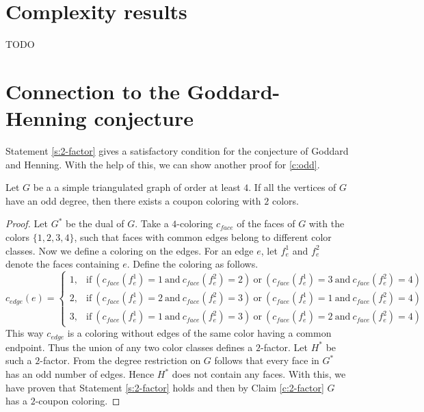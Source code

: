 \section{Complexity results}
TODO

\section{Connection to the Goddard-Henning conjecture}

Statement \ref{s:2-factor} gives a satisfactory condition for the conjecture of
Goddard and Henning. With the help of this, we can show another proof for \ref{c:odd}.

\begin{thm}\label{thm:odd}
  Let $G$ be a a simple triangulated graph of order at least $4$. If all the
  vertices of $G$ have an odd degree, then there exists a coupon coloring with $2$ colors.
\end{thm}
\begin{proof}
  Let $G^*$ be the dual of $G$. Take a $4$-coloring $c_{face}$ of the faces of
  $G$ with the colors $\{ 1, 2, 3, 4 \}$, such that faces with common edges belong to
  different color classes. Now we define a coloring on the edges. For an edge $e$,
  let $f_e^1$ and $f_e^2$ denote the faces containing $e$. Define the coloring as follows.
  \[
    c_{edge}(e) =
    \begin{cases}
      1, & \text{if}\ (c_{face}(f_e^1) = 1 \ \text{and}\ c_{face}(f_e^2) = 2) \ \text{or}\
        (c_{face}(f_e^1) = 3 \ \text{and}\ c_{face}(f_e^2) = 4)\\
      2, & \text{if}\ (c_{face}(f_e^1) = 2 \ \text{and}\ c_{face}(f_e^2) = 3) \ \text{or}\
        (c_{face}(f_e^1) = 1 \ \text{and}\ c_{face}(f_e^2) = 4)\\
      3, & \text{if}\ (c_{face}(f_e^1) = 1 \ \text{and}\ c_{face}(f_e^2) = 3) \ \text{or}\
        (c_{face}(f_e^1) = 2 \ \text{and}\ c_{face}(f_e^2) = 4)
    \end{cases}
  \]
  This way $c_{edge}$ is a coloring without edges of the same color having a common
  endpoint. Thus the union of any two color classes defines a $2$-factor. Let $H^*$
  be such a $2$-factor. From the degree restriction on $G$ follows that every face
  in $G^*$ has an odd number of edges. Hence $H^*$ does not contain any faces. With this,
  we have proven that Statement \ref{s:2-factor} holds and then by Claim \ref{c:2-factor}
  $G$ has a $2$-coupon coloring.
\end{proof}
